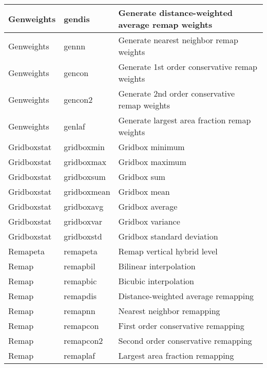 \begin{tabular}[t]{|l|>{\columncolor{pcolor1}}l|l|}
Genweights   & gendis          & Generate distance-weighted average remap weights \\ \hline
Genweights   & gennn           & Generate nearest neighbor remap weights \\ \hline
Genweights   & gencon          & Generate 1st order conservative remap weights \\ \hline
Genweights   & gencon2         & Generate 2nd order conservative remap weights \\ \hline
Genweights   & genlaf          & Generate largest area fraction remap weights \\ \hline
Gridboxstat  & gridboxmin      & Gridbox minimum \\ \hline
Gridboxstat  & gridboxmax      & Gridbox maximum \\ \hline
Gridboxstat  & gridboxsum      & Gridbox sum \\ \hline
Gridboxstat  & gridboxmean     & Gridbox mean \\ \hline
Gridboxstat  & gridboxavg      & Gridbox average \\ \hline
Gridboxstat  & gridboxvar      & Gridbox variance \\ \hline
Gridboxstat  & gridboxstd      & Gridbox standard deviation \\ \hline
Remapeta     & remapeta        & Remap vertical hybrid level \\ \hline
Remap        & remapbil        & Bilinear interpolation \\ \hline
Remap        & remapbic        & Bicubic interpolation \\ \hline
Remap        & remapdis        & Distance-weighted average remapping \\ \hline
Remap        & remapnn         & Nearest neighbor remapping \\ \hline
Remap        & remapcon        & First order conservative remapping \\ \hline
Remap        & remapcon2       & Second order conservative remapping \\ \hline
Remap        & remaplaf        & Largest area fraction remapping \\ \hline

\end{tabular}
